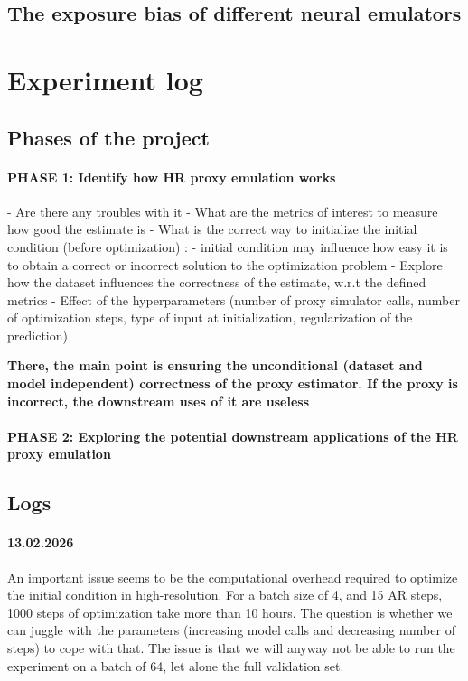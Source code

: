 \documentclass{article}
\begin{document}
\subsection{The exposure bias of different neural emulators}

\section{Experiment log}

\subsection{Phases of the project}

\paragraph{PHASE 1: Identify how HR proxy emulation works}

- Are there any troubles with it
- What are the metrics of interest to measure how good the estimate is
- What is the correct way to initialize the initial condition (before optimization) :
    - initial condition may influence how easy it is to obtain a correct or incorrect solution to the optimization problem
- Explore how the dataset influences the correctness of the estimate, w.r.t the defined metrics
- Effect of the hyperparameters (number of proxy simulator calls, number of optimization steps, type of input at initialization, regularization of the prediction)

\textbf{There, the main point is ensuring the unconditional (dataset and model independent) correctness of the proxy estimator. If the proxy is incorrect, the downstream uses of it are useless}

\paragraph{PHASE 2: Exploring the potential downstream applications of the HR proxy emulation}

\subsection{Logs}

\paragraph{13.02.2026}
An important issue seems to be the computational overhead required to optimize the initial condition in high-resolution. For a batch size of 4, and 15 AR steps, 1000 steps of optimization take more than 10 hours. The question is whether we can juggle with the parameters (increasing model calls and decreasing number of steps) to cope with that. The issue is that we will anyway not be able to run the experiment on a batch of 64, let alone the full validation set. 
\end{document}
